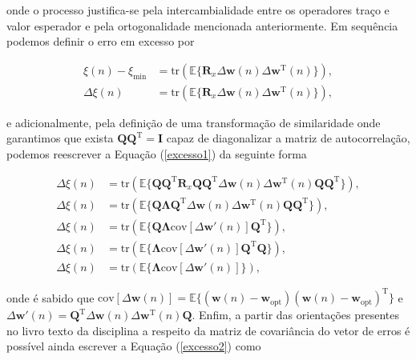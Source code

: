 \documentclass[a4paper,10pt]{article}
\begin{document}
\begin{enumerate}
\begin{enumerate}
						onde o processo justifica-se pela intercambialidade entre os operadores traço e valor esperador e pela ortogonalidade mencionada anteriormente. Em sequência podemos definir o erro em excesso por

						\begin{align}
							\xi(n) - \xi_{\text{min}} &= \text{tr}(\mathbb{E}\{\mathbf{R}_{x} \Delta \mathbf{w}(n) \Delta \mathbf{w}^{\text{T}}(n)\}), \\
							\Delta \xi(n) &= \text{tr}(\mathbb{E}\{\mathbf{R}_{x} \Delta \mathbf{w}(n) \Delta \mathbf{w}^{\text{T}}(n)\}), \label{excesso1}
						\end{align}

						e adicionalmente, pela definição de uma transformação de similaridade onde garantimos que exista $\mathbf{Q} \mathbf{Q}^{\text{T}} = \mathbf{I}$ capaz de diagonalizar a matriz de autocorrelação, podemos reescrever a Equação (\ref{excesso1}) da seguinte forma

						\begin{align}
							\Delta \xi(n) &= \text{tr}(\mathbb{E}\{\mathbf{Q} \mathbf{Q}^{\text{T}} \mathbf{R}_{x} \mathbf{Q} \mathbf{Q}^{\text{T}} \Delta \mathbf{w}(n) \Delta \mathbf{w}^{\text{T}}(n) \mathbf{Q} \mathbf{Q}^{\text{T}}\}), \\
							\Delta \xi(n) &= \text{tr}(\mathbb{E}\{\mathbf{Q} \mathbf{\Lambda} \mathbf{Q}^{\text{T}} \Delta \mathbf{w}(n) \Delta \mathbf{w}^{\text{T}}(n) \mathbf{Q} \mathbf{Q}^{\text{T}}\}), \\
							\Delta \xi(n) &= \text{tr}(\mathbb{E}\{\mathbf{Q} \mathbf{\Lambda} \text{cov} \left[\Delta \mathbf{w}'(n)\right] \mathbf{Q}^{\text{T}}\}), \\
							\Delta \xi(n) &= \text{tr}(\mathbb{E}\{\mathbf{\Lambda} \text{cov} \left[\Delta \mathbf{w}'(n)\right] \mathbf{Q}^{\text{T}} \mathbf{Q}\}), \\
							\Delta \xi(n) &= \text{tr}(\mathbb{E}\{\mathbf{\Lambda} \text{cov} \left[\Delta \mathbf{w}'(n)\right]\}), \label{excesso2}
						\end{align}

						onde é sabido que $\text{cov} \left[\Delta \mathbf{w}(n)\right] = \mathbb{E}\{(\mathbf{w}(n) - \mathbf{w}_{\text{opt}}) (\mathbf{w}(n) - \mathbf{w}_{\text{opt}})^{\text{T}}\}$ e $\Delta \mathbf{w}'(n) = \mathbf{Q}^{\text{T}} \Delta \mathbf{w}(n) \Delta \mathbf{w}^{\text{T}}(n) \mathbf{Q}$.
						Enfim, a partir das orientações presentes no livro texto da disciplina a respeito da matriz de covariância do vetor de erros é possível ainda escrever a Equação (\ref{excesso2}) como


\end{enumerate}
\end{enumerate}
\end{document}

